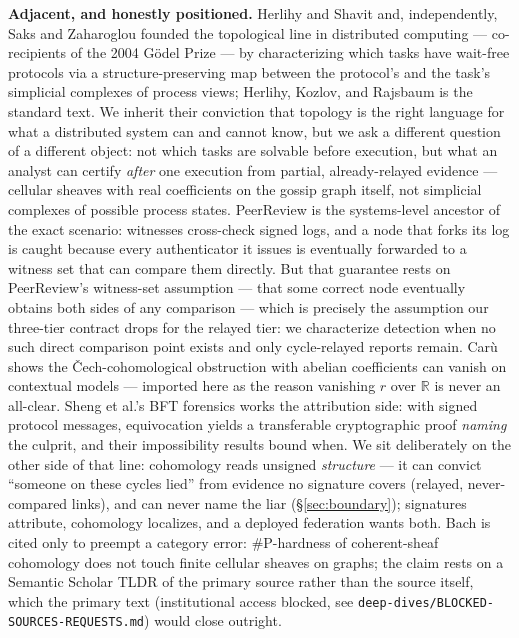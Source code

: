 \documentclass[11pt,a4paper]{article}
\begin{document}
\textbf{Adjacent, and honestly positioned.} Herlihy and Shavit \cite{herlihy-shavit} and, independently, Saks and
Zaharoglou \cite{saks-zaharoglou} founded the topological line in distributed computing --- co-recipients of the 2004
G\"odel Prize --- by characterizing which tasks have wait-free protocols via a structure-preserving map between the
protocol's and the task's simplicial complexes of process views; Herlihy, Kozlov, and Rajsbaum
\cite{herlihy-kozlov-rajsbaum} is the standard text. We inherit their conviction that topology is the right language for
what a distributed system can and cannot know, but we ask a different question of a different object: not which tasks are
solvable before execution, but what an analyst can certify \emph{after} one execution from partial, already-relayed
evidence --- cellular sheaves with real coefficients on the gossip graph itself, not simplicial complexes of possible
process states. PeerReview \cite{peerreview} is the systems-level ancestor of the exact scenario: witnesses cross-check
signed logs, and a node that forks its log is caught because every authenticator it issues is eventually forwarded to a
witness set that can compare them directly. But that guarantee rests on PeerReview's witness-set assumption --- that some
correct node eventually obtains both sides of any comparison --- which is precisely the assumption our three-tier
contract drops for the relayed tier: we characterize detection when no such direct comparison point exists and only
cycle-relayed reports remain. Car\`u \cite{caru} shows the \v{C}ech-cohomological obstruction with
abelian coefficients can vanish on contextual models --- imported here as the reason vanishing $r$ over $\mathbb{R}$ is
never an all-clear. Sheng et al.'s BFT forensics \cite{sheng} works the attribution side: with signed protocol messages,
equivocation yields a transferable cryptographic proof \emph{naming} the culprit, and their impossibility results bound
when. We sit deliberately on the other side of that line: cohomology reads unsigned \emph{structure} --- it can convict
``someone on these cycles lied'' from evidence no signature covers (relayed, never-compared links), and can never name the
liar (\S\ref{sec:boundary}); signatures attribute, cohomology localizes, and a deployed federation wants both. Bach
\cite{bach} is cited only to preempt a category error: \#P-hardness of coherent-sheaf cohomology does not touch finite
cellular sheaves on graphs; the claim rests on a Semantic Scholar TLDR of the primary source rather than the source
itself, which the primary text (institutional access blocked, see \texttt{deep-dives/BLOCKED-SOURCES-REQUESTS.md}) would
close outright.
\end{document}
